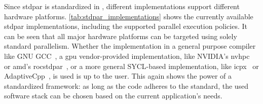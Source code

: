 Since stdpar is standardized in , different implementations support different hardware platforms. 
\autoref{tab:stdpar_implementations} shows the currently available stdpar implementations, including the supported parallel execution policies. 
It can be seen that all major hardware platforms can be targeted using solely \cpp standard parallelism. 
Whether the implementation in a general purpose compiler like GNU GCC~\cite{gnu_gcc_2025}, a \gls{gpu} vendor-provided implementation, like NVIDIA's nvhpc~\cite{nvidia_accelerating_2020} or \gls{amd}'s rocstdpar~\cite{voicu_rocmroc-stdpar_2024}, or a more general SYCL-based implementation, like icpx~\cite{intel_intel_2025} or AdaptiveCpp~\cite{alpay_adaptivecpp_2024}, is used is up to the user. 
This again shows the power of a standardized framework: as long as the code adheres to the standard, the used software stack can be chosen based on the current application's needs. 

